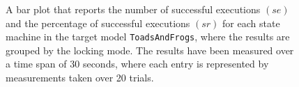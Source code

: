 \begin{figure}[h!]
\centering
\begin{minipage}{1\textwidth}
  \centering
  \makebox[\textwidth][c]{ %
        \resizebox{1.19\textwidth}{!}{ %
            
        }%
    }%
\end{minipage}
\caption{A bar plot that reports the number of successful executions $(se)$ and the percentage of successful executions $(sr)$ for each state machine in the target model \texttt{ToadsAndFrogs}, where the results are grouped by the locking mode. The results have been measured over a time span of 30 seconds, where each entry is represented by measurements taken over 20 trials.}
\label{figure:locking_mode_state_machine_transition_frequency_comparison_toadsandfrogs}
\end{figure}